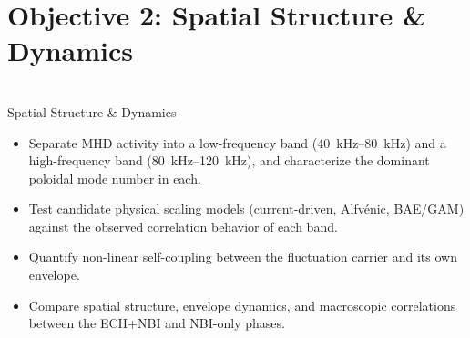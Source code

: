 \documentclass[aspectratio=169]{beamer}
\begin{document}
\section{Objective 2: Spatial Structure \& Dynamics}

\begin{frame}
    \vspace{0.3cm}
    \begin{center}
        {}\\[0.3cm]
        {\Large Spatial Structure \& Dynamics}
    \end{center}
    \vspace{0.7cm}
    \begin{itemize}
        \item Separate MHD activity into a low-frequency band (\SIrange{40}{80}{\kilo\hertz}) and a high-frequency band (\SIrange{80}{120}{\kilo\hertz}), and characterize the dominant poloidal mode number in each.
        \item Test candidate physical scaling models (current-driven, Alfvénic, BAE/GAM) against the observed correlation behavior of each band.
        \item Quantify non-linear self-coupling between the fluctuation carrier and its own envelope.
        \item Compare spatial structure, envelope dynamics, and macroscopic correlations between the ECH+NBI and NBI-only phases.
    \end{itemize}
\end{frame}
\end{document}
